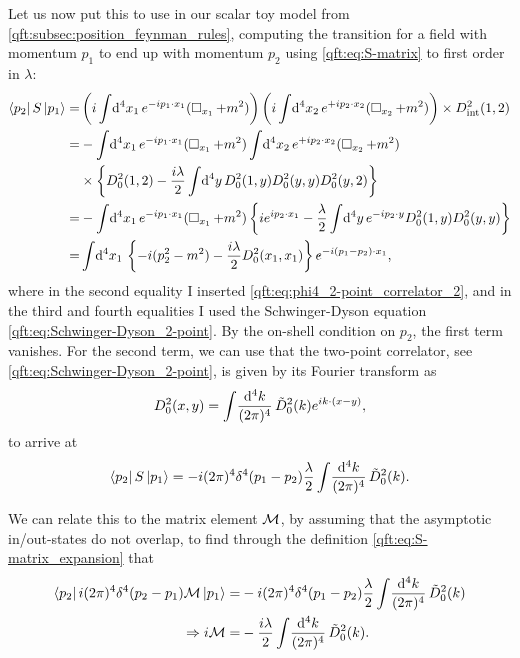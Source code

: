 \documentclass[../main.tex]{subfiles}
\begin{document}
Let us now put this to use in our scalar toy model from \cref{qft:subsec:position_feynman_rules}, computing the transition for a field with momentum \(p_1\) to end up with momentum \(p_2\) using \cref{qft:eq:S-matrix} to first order in \(\lambda\):
\begin{align}
  \nonumber
  \bra{p_2} S \ket{p_1} = & \pclosed{i\integral{^4x_1} \exp{-ip_1 \cdot x_1} (\dA_{x_1} + m^2)} \pclosed{ i \integral{^4x_2} \exp{+ip_2 \cdot x_2} (\dA_{x_2} + m^2)} \times D_{\text{int}}^2(1, 2) \\
  \nonumber
  =                       & -\integral{^4x_1} \exp{-ip_1 \cdot x_1} (\dA_{x_1} + m^2) \integral{^4x_2} \exp{+ip_2 \cdot x_2} (\dA_{x_2} + m^2)                                                      \\
  \nonumber
                          & \times \cclosed{D_0^2(1,2) - \frac{i\lambda}{2} \integral{^4y} D_0^2(1,y)D_0^2(y,y) D_0^2(y,2)}                                                                         \\
  \nonumber
  =                       & -\integral{^4x_1} \exp{-ip_1 \cdot x_1} (\dA_{x_1} + m^2) \cclosed{i \exp{ip_2\cdot x_1} - \frac{\lambda}{2}\integral{^4y} \exp{-ip_2\cdot y} D_0^2(1,y) D_0^2(y,y)}    \\
  =                       & \integral{^4x_1} \cclosed{-i (p^2_2 - m^2)- \frac{i\lambda}{2} D_0^2(x_1,x_1)} \exp{-i(p_1-p_2) \cdot x_1},
\end{align}
where in the second equality I inserted \cref{qft:eq:phi4_2-point_correlator_2}, and in the third and fourth equalities I used the Schwinger-Dyson equation \cref{qft:eq:Schwinger-Dyson_2-point}.
By the on-shell condition on \(p_2\), the first term vanishes.
For the second term, we can use that the two-point correlator, see \cref{qft:eq:Schwinger-Dyson_2-point}, is given by its Fourier transform as
\begin{equation}
  D_0^2(x,y) = \int\!\frac{\mathrm{d}^{4}k}{(2\pi)^{4}}\, \tilde{D}_0^2(k) e^{ik\cdot(x-y)},
\end{equation}
to arrive at
\begin{equation}
  \left\langle p_2 \right| S \left| p_1 \right\rangle = -i(2\pi)^4 \delta^4(p_1 - p_2) \frac{\lambda}{2} \int\!\frac{\mathrm{d}^{4}k}{(2\pi)^{4}}\, \tilde{D}_0^2(k).
\end{equation}

We can relate this to the matrix element \(\mathcal{M}\), by assuming that the asymptotic in/out-states do not overlap, to find through the definition \cref{qft:eq:S-matrix_expansion} that
\begin{align}
  \nonumber
  \left\langle p_2 \right| i(2\pi)^4 \delta^4(p_2-p_1) \mathcal{M} \left| p_1 \right\rangle = & -i(2\pi)^4 \delta^4(p_1 - p_2) \frac{\lambda}{2} \int\!\frac{\mathrm{d}^{4}k}{(2\pi)^{4}}\, \tilde{D}_0^2(k) \\
  \Rightarrow i\mathcal{M} =                                    & - \frac{i \lambda}{2} \int\!\frac{\mathrm{d}^{4}k}{(2\pi)^{4}}\, \tilde{D}_0^2(k).
\end{align}
\end{document}

